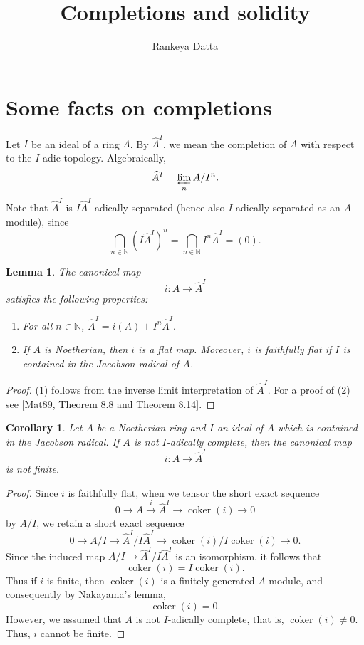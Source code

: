 \documentclass[11pt]{amsart}
\title{Completions and solidity}
\author{Rankeya Datta\vspace{-2ex}}
\DeclareMathOperator{\coker}{coker}
\theoremstyle{plain}
\newtheorem{lemma}[subsubsection]{Lemma}
\newtheorem{corollary}[subsubsection]{Corollary}
\theoremstyle{definition}
\theoremstyle{definition}
\theoremstyle{plain}
\theoremstyle{plain}
\numberwithin{equation}{subsubsection}
\numberwithin{equation}{subsubsection}
\begin{document}
\maketitle

\section{Some facts on completions}
Let $I$ be an ideal of a ring $A$. By $\widehat{A}^I$, we mean the completion of $A$ with respect to the $I$-adic topology. Algebraically, 
$$\widehat{A}^I = \varprojlim_{n} A/I^n.$$
Note that $\widehat{A}^I$ is $I\widehat{A}^I$-adically separated (hence also $I$-adically separated as an $A$-module), since
$$\bigcap_{n \in \mathbb N} (I\widehat{A}^I)^n = \bigcap_{n \in \mathbb N} I^n\widehat{A}^I = (0).$$

\begin{lemma}
\label{completion-map-basic-properties}
The canonical map
$$i: A \rightarrow \widehat{A}^I$$
satisfies the following properties:
\begin{enumerate}
\item For all $n \in \mathbb{N}$, $\widehat{A}^I = i(A) + I^n\widehat{A}^I.$
\item If $A$ is Noetherian, then $i$ is a flat map. Moreover, $i$ is faithfully flat if $I$ is contained in the Jacobson radical of $A$.
\end{enumerate}
\end{lemma}

\begin{proof}
(1) follows from the inverse limit interpretation of $\widehat{A}^I$. For a proof of (2) see [Mat89, Theorem 8.8 and Theorem 8.14].
\end{proof}


\begin{corollary}
\label{completion-not-fg}
Let $A$ be a Noetherian ring and $I$ an ideal of $A$ which is contained in the Jacobson radical. If $A$ is not $I$-adically complete, then the canonical map
$$i: A \rightarrow \widehat{A}^I$$
is not finite.
\end{corollary}

\begin{proof}
Since $i$ is faithfully flat, when we tensor the short exact sequence
$$0 \rightarrow A \xrightarrow{i} \widehat{A}^I \rightarrow \coker(i) \rightarrow 0$$
by $A/I$, we retain a short exact sequence
$$0 \rightarrow A/I \rightarrow \widehat{A}^I/I\widehat{A}^I \rightarrow \coker(i)/I\coker(i) \rightarrow 0.$$
Since the induced map $A/I \rightarrow \widehat{A}^I/I\widehat{A}^I$ is an isomorphism, it follows that
$$\coker(i) = I\coker(i).$$
Thus if $i$ is finite, then $\coker(i)$ is a finitely generated $A$-module, and consequently by Nakayama's lemma,
$$\coker(i) = 0.$$
However, we assumed that $A$ is not $I$-adically complete, that is, $\coker(i) \neq 0$. Thus, $i$ cannot be finite.
\end{proof}
\end{document}

